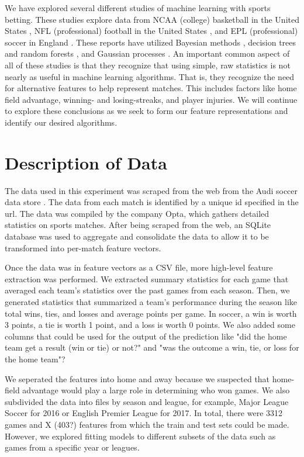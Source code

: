 We have explored several different studies of machine learning with sports betting. These studies explore data from NCAA (college) basketball in the United States \cite{zimmermann2013predicting}, NFL (professional) football in the United States \cite{warner2010predicting}, and EPL (professional) soccer in England \cite{constantinou2012pi}. These reports have utilized Bayesian methods \cite{constantinou2012pi, zimmermann2013predicting}, decision trees and random forests \cite{zimmermann2013predicting}, and Gaussian processes \cite{warner2010predicting}. An important common aspect of all of these studies is that they recognize that using simple, raw statistics is not nearly as useful in machine learning algorithms. That is, they recognize the need for alternative features to help represent matches. This includes factors like home field advantage, winning- and losing-streaks, and player injuries. We will continue to explore these conclusions as we seek to form our feature representations and identify our desired algorithms.

\section {Description of Data}

The data used in this experiment was scraped from the web from the Audi soccer data store \cite{audi}. The data from each match is identified by a unique id specified in the url. The data was compiled by the company Opta, which gathers detailed statistics on sports matches. After being scraped from the web, an SQLite database was used to aggregate and consolidate the data to allow it to be transformed into per-match feature vectors.

Once the data was in feature vectors as a CSV file, more high-level feature extraction was performed. We extracted summary statistics for each game that averaged each team's statistics over the past games from each season. Then, we generated statistics that summarized a team's performance during the season like total wins, ties, and losses and average points per game. In soccer, a win is worth 3 points, a tie is worth 1 point, and a loss is worth 0 points. We also added some columns that could be used for the output of the prediction like "did the home team get a result (win or tie) or not?" and "was the outcome a win, tie, or loss for the home team"? 

We seperated the features into home and away because we suspected that home-field advantage would play a large role in determining who won games. We also subdivided the data into files by season and league, for example, Major League Soccer for 2016 or English Premier League for 2017. In total, there were 3312 games and X (403?) features from which the train and test sets could be made. However, we explored fitting models to different subsets of the data such as games from a specific year or leagues.

